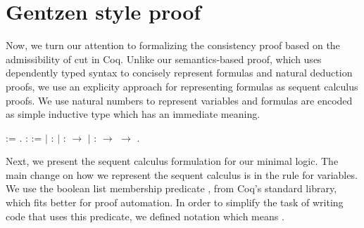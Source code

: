\section{Gentzen style proof}\label{sec:admissibility}


Now, we turn our attention to formalizing the consistency proof based on the admissibility of cut in Coq.
Unlike our semantics-based proof, which uses dependently typed syntax to concisely represent formulas and
natural deduction proofs, we use an explicity approach for representing formulas as sequent calculus proofs.
We use natural numbers to represent variables and formulas are encoded as simple inductive type which has
an immediate meaning.
 \begin{coqdoccode}
\coqdocemptyline
\coqdocnoindent
{}  := .\coqdoceol
\coqdocemptyline
\coqdocnoindent
{} \coqdocvar{$\alpha$} :  :=\coqdoceol
\coqdocnoindent
\ensuremath{|}   : \coqdocvar{$\alpha$} \coqdoceol
\coqdocnoindent
\ensuremath{|}      :  \ensuremath{\rightarrow} \coqdocvar{$\alpha$}\coqdoceol
\coqdocnoindent
\ensuremath{|}  : \coqdocvar{$\alpha$} \ensuremath{\rightarrow} \coqdocvar{$\alpha$} \ensuremath{\rightarrow} \coqdocvar{$\alpha$}.\coqdoceol
\coqdocemptyline
\end{coqdoccode}
Next, we present the sequent calculus formulation for our minimal logic.
The main change on how we represent the sequent calculus is in the
rule for variables. We use the boolean list membership predicate
, from Coq's standard library, which fits better for proof automation. In order to
simplify the task of writing code that uses this predicate, we defined
notation  \coqdocvar{$\in$}  which means   . 


